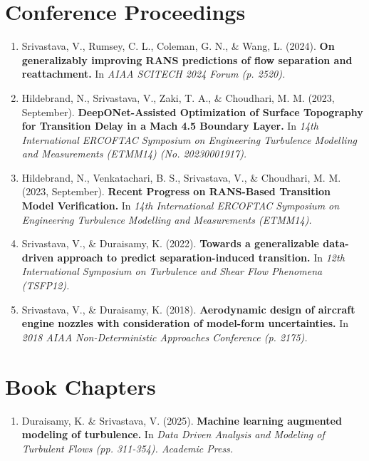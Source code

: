 \documentclass[letterpaper, 11pt]{article}
\begin{document}
  \section{Conference Proceedings}
  {
    \small
    \begin{enumerate}
      \item
      Srivastava, V., Rumsey, C. L., Coleman, G. N., \& Wang, L. (2024).%
      \textbf{
        On generalizably improving RANS predictions of flow separation and reattachment.
      }In\textit{
        AIAA SCITECH 2024 Forum (p. 2520).
      }

      \item
      Hildebrand, N., Srivastava, V., Zaki, T. A., \& Choudhari, M. M. (2023, September).%
      \textbf{
        DeepONet-Assisted Optimization of Surface Topography for Transition Delay in a Mach 4.5
        Boundary Layer.
      }In\textit{
        14th International ERCOFTAC Symposium on Engineering Turbulence Modelling and
        Measurements (ETMM14) (No. 20230001917).
      }

      \item
      Hildebrand, N., Venkatachari, B. S., Srivastava, V., \& Choudhari, M. M. (2023, September).%
      \textbf{
        Recent Progress on RANS-Based Transition Model Verification.
      }In\textit{
        14th International ERCOFTAC Symposium on Engineering Turbulence Modelling 
        and Measurements (ETMM14).
      }

      \item
      Srivastava, V., \& Duraisamy, K. (2022).%
      \textbf{
        Towards a generalizable data-driven approach to predict separation-induced transition.
      }In\textit{
        12th International Symposium on Turbulence and Shear Flow Phenomena (TSFP12).
      }

      \item
      Srivastava, V., \& Duraisamy, K. (2018).%
      \textbf{
        Aerodynamic design of aircraft engine nozzles with consideration of model-form uncertainties.
      }In\textit{
        2018 AIAA Non-Deterministic Approaches Conference (p. 2175).
      }
    \end{enumerate}
  }

  \newpage


  \vspace*{0.25in}
  \section{Book Chapters}
  {
    \small
    \begin{enumerate}
      \item
      Duraisamy, K. \& Srivastava, V. (2025).%
      \textbf{
        Machine learning augmented modeling of turbulence.
      }In\textit{
        Data Driven Analysis and Modeling of Turbulent Flows (pp. 311-354). Academic Press.
      }
    \end{enumerate}
  }
\end{document}
